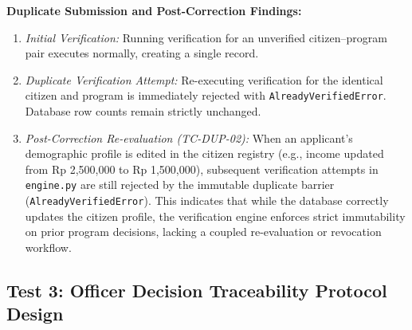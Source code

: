 \documentclass[runningheads]{llncs}
\begin{document}
\begin{table}[htbp]
\caption{Boundary value test points and evaluation outcomes}
\label{tab:boundary}
\centering
{}
\end{table}

\noindent\textbf{Duplicate Submission and Post-Correction Findings:}
\begin{enumerate}
    \item \textit{Initial Verification:} Running verification for an unverified citizen--program pair executes normally, creating a single record.
    \item \textit{Duplicate Verification Attempt:} Re-executing verification for the identical citizen and program is immediately rejected with \texttt{AlreadyVerifiedError}. Database row counts remain strictly unchanged.
    \item \textit{Post-Correction Re-evaluation (TC-DUP-02):} When an applicant's demographic profile is edited in the citizen registry (e.g., income updated from Rp 2,500,000 to Rp 1,500,000), subsequent verification attempts in \texttt{engine.py} are still rejected by the immutable duplicate barrier (\texttt{AlreadyVerifiedError}). This indicates that while the database correctly updates the citizen profile, the verification engine enforces strict immutability on prior program decisions, lacking a coupled re-evaluation or revocation workflow.
\end{enumerate}

\subsection{Test 3: Officer Decision Traceability Protocol Design}
\end{document}
